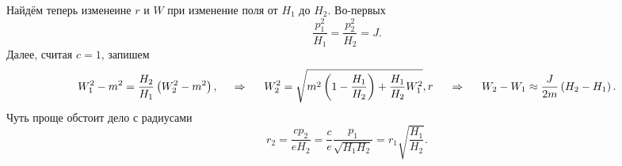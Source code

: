 Найдём теперь изменеине $r$ и $W$ при изменение поля от $H_1$ до $H_2$. Во-первых
\begin{equation*}
    \frac{p_1^2}{H_1} = \frac{p_2^2}{H_2} = J.
\end{equation*}
Далее, считая $c=1$, запишем
\begin{equation*}
    W^2_1 - m^2 = \frac{H_2}{H_1}\left(W_2^2 -m^2\right), \hspace{0.5cm} \Rightarrow \hspace{0.5cm}
    W_2^2 = \sqrt{m^2 \left(1- \frac{H_1}{H_2} \right) + \frac{H_1}{H_2} W_1^2},r
    \hspace{0.5cm} \Rightarrow \hspace{0.5cm}
    W_2 - W_1 \approx \frac{J}{2m}\left(H_2-H_1\right).
\end{equation*}
Чуть проще обстоит дело с радиусами
\begin{equation*}
    r_2 = \frac{c p_2}{e H_2} = \frac{c}{e} \frac{p_1}{\sqrt{H_1 H_2}} = r_1 \sqrt{\frac{H_1}{H_2}}.
\end{equation*}






